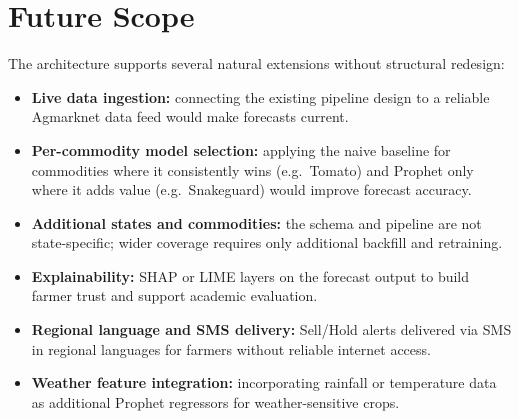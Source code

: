 \section{Future Scope}
The architecture supports several natural extensions without structural
redesign:
\begin{itemize}
    \item \textbf{Live data ingestion:} connecting the existing pipeline
    design to a reliable Agmarknet data feed would make forecasts current.
    \item \textbf{Per-commodity model selection:} applying the naive
    baseline for commodities where it consistently wins (e.g.\ Tomato)
    and Prophet only where it adds value (e.g.\ Snakeguard) would improve
    forecast accuracy.
    \item \textbf{Additional states and commodities:} the schema and
    pipeline are not state-specific; wider coverage requires only
    additional backfill and retraining.
    \item \textbf{Explainability:} SHAP or LIME layers on the forecast
    output to build farmer trust and support academic evaluation.
    \item \textbf{Regional language and SMS delivery:} Sell/Hold alerts
    delivered via SMS in regional languages for farmers without reliable
    internet access.
    \item \textbf{Weather feature integration:} incorporating rainfall
    or temperature data as additional Prophet regressors for
    weather-sensitive crops.
\end{itemize}
